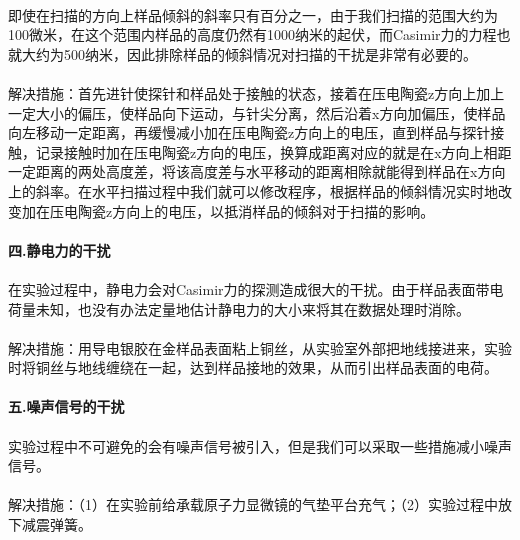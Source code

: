 \paragraph*{}
即使在扫描的方向上样品倾斜的斜率只有百分之一，由于我们扫描的范围大约为100微米，在这个范围内样品的高度仍然有1000纳米的起伏，而Casimir力的力程也就大约为500纳米，因此排除样品的倾斜情况对扫描的干扰是非常有必要的。
\paragraph*{}
解决措施：首先进针使探针和样品处于接触的状态，接着在压电陶瓷z方向上加上一定大小的偏压，使样品向下运动，与针尖分离，然后沿着x方向加偏压，使样品向左移动一定距离，再缓慢减小加在压电陶瓷z方向上的电压，直到样品与探针接触，记录接触时加在压电陶瓷z方向的电压，换算成距离对应的就是在x方向上相距一定距离的两处高度差，将该高度差与水平移动的距离相除就能得到样品在x方向上的斜率。在水平扫描过程中我们就可以修改程序，根据样品的倾斜情况实时地改变加在压电陶瓷z方向上的电压，以抵消样品的倾斜对于扫描的影响。
\paragraph*{}
\paragraph*{四.静电力的干扰}
\paragraph*{}
在实验过程中，静电力会对Casimir力的探测造成很大的干扰。由于样品表面带电荷量未知，也没有办法定量地估计静电力的大小来将其在数据处理时消除。
\paragraph*{}
解决措施：用导电银胶在金样品表面粘上铜丝，从实验室外部把地线接进来，实验时将铜丝与地线缠绕在一起，达到样品接地的效果，从而引出样品表面的电荷。
\paragraph*{}
\paragraph*{五.噪声信号的干扰}
\paragraph*{}
实验过程中不可避免的会有噪声信号被引入，但是我们可以采取一些措施减小噪声信号。
\paragraph*{}
解决措施：（1）在实验前给承载原子力显微镜的气垫平台充气；（2）实验过程中放下减震弹簧。